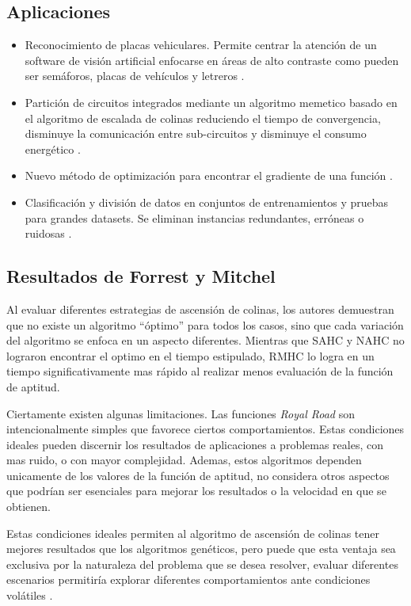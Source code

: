 \documentclass[12pt,twoside]{article}
\begin{document}
	\subsection{Aplicaciones}
	
	\begin{itemize}
		\item Reconocimiento de placas vehiculares. Permite centrar la atención de un software de visión artificial enfocarse en áreas de alto contraste como pueden ser semáforos, placas de vehículos y letreros \cite{2}.
		\item Partición de circuitos integrados mediante un algoritmo memetico basado en el algoritmo de escalada de colinas reduciendo el tiempo de convergencia, disminuye la comunicación entre sub-circuitos y disminuye el consumo energético \cite{3}.
		\item  Nuevo método de optimización para encontrar el gradiente de una función \cite{4}.
		\item Clasificación y división de datos en conjuntos de entrenamientos y pruebas para grandes datasets. Se eliminan instancias redundantes, erróneas o ruidosas \cite{5}.
	\end{itemize}
	
	\subsection{Resultados de Forrest y Mitchel}

	Al evaluar diferentes estrategias de ascensión de colinas, los autores demuestran que no existe un algoritmo ``óptimo'' para todos los casos, sino que cada variación del algoritmo se enfoca en un aspecto diferentes. Mientras que SAHC y NAHC no lograron encontrar el optimo en el tiempo estipulado, RMHC lo logra en un tiempo significativamente mas rápido al realizar menos evaluación de la función de aptitud.
	
	Ciertamente existen  algunas limitaciones. Las funciones \textit{Royal Road} son intencionalmente simples que favorece ciertos comportamientos. Estas condiciones ideales pueden discernir los resultados de aplicaciones a problemas reales, con mas ruido, o con mayor complejidad. Ademas, estos algoritmos dependen unicamente de los valores de la función de aptitud, no considera otros aspectos que podrían ser esenciales para mejorar los resultados o la velocidad en que se obtienen.
	
	Estas condiciones ideales permiten al algoritmo de ascensión de colinas tener mejores resultados que los algoritmos genéticos, pero puede que esta ventaja sea exclusiva por la naturaleza del problema que se desea resolver, evaluar diferentes escenarios permitiría explorar diferentes comportamientos ante condiciones volátiles \cite{6}.
\end{document}
